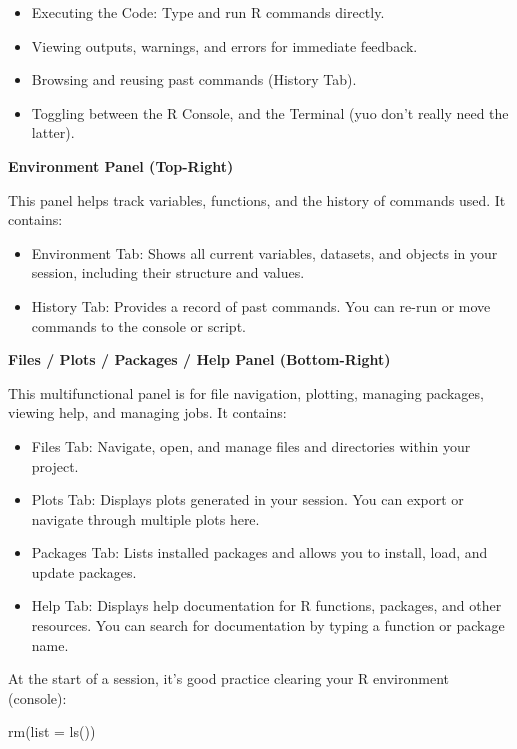 \documentclass[
  letterpaper,
  DIV=11,
  numbers=noendperiod]{scrreprt}
\newenvironment{Shaded}{\begin{snugshade}}{\end{snugshade}}
\newcommand{\AttributeTok}[1]{\textcolor[rgb]{0.40,0.45,0.13}{#1}}
\newcommand{\FunctionTok}[1]{\textcolor[rgb]{0.28,0.35,0.67}{#1}}
\newcommand{\NormalTok}[1]{\textcolor[rgb]{0.00,0.23,0.31}{#1}}
\providecommand{\tightlist}{%
  \setlength{\itemsep}{0pt}\setlength{\parskip}{0pt}}\usepackage{longtable,booktabs,array}
\begin{document}
\begin{itemize}
\tightlist
\item
  Executing the Code: Type and run R commands directly.
\item
  Viewing outputs, warnings, and errors for immediate feedback.
\item
  Browsing and reusing past commands (History Tab).
\item
  Toggling between the R Console, and the Terminal (yuo don't really
  need the latter).
\end{itemize}

\textbf{Environment Panel (Top-Right)}

This panel helps track variables, functions, and the history of commands
used. It contains:

\begin{itemize}
\tightlist
\item
  Environment Tab: Shows all current variables, datasets, and objects in
  your session, including their structure and values.
\item
  History Tab: Provides a record of past commands. You can re-run or
  move commands to the console or script.
\end{itemize}

\textbf{Files / Plots / Packages / Help Panel (Bottom-Right)}

This multifunctional panel is for file navigation, plotting, managing
packages, viewing help, and managing jobs. It contains:

\begin{itemize}
\tightlist
\item
  Files Tab: Navigate, open, and manage files and directories within
  your project.
\item
  Plots Tab: Displays plots generated in your session. You can export or
  navigate through multiple plots here.
\item
  Packages Tab: Lists installed packages and allows you to install,
  load, and update packages.
\item
  Help Tab: Displays help documentation for R functions, packages, and
  other resources. You can search for documentation by typing a function
  or package name.
\end{itemize}

At the start of a session, it's good practice clearing your R
environment (console):

\begin{Shaded}
\begin{Highlighting}[]
\FunctionTok{rm}\NormalTok{(}\AttributeTok{list =} \FunctionTok{ls}\NormalTok{())}
\end{Highlighting}
\end{Shaded}
\end{document}
